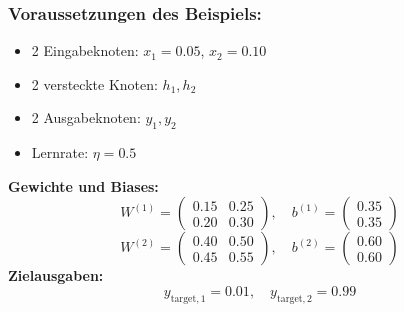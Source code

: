 \documentclass[12pt]{article}
\begin{document}
\subsubsection*{Voraussetzungen des Beispiels:}

\begin{itemize}
    \item 2 Eingabeknoten: \( x_1 = 0.05 \), \( x_2 = 0.10 \)
    \item 2 versteckte Knoten: \( h_1, h_2 \)
    \item 2 Ausgabeknoten: \( y_1, y_2 \)
    \item Lernrate: \( \eta = 0.5 \)
\end{itemize}
%
\textbf{Gewichte und Biases:}
\[
W^{(1)} = \begin{pmatrix} 0.15 & 0.25 \\ 0.20 & 0.30 \end{pmatrix}, \quad
b^{(1)} = \begin{pmatrix} 0.35 \\ 0.35 \end{pmatrix}
\]
\[
W^{(2)} = \begin{pmatrix} 0.40 & 0.50 \\ 0.45 & 0.55 \end{pmatrix}, \quad
b^{(2)} = \begin{pmatrix} 0.60 \\ 0.60 \end{pmatrix}
\]
%
\textbf{Zielausgaben:}
\[
y_{\text{target}, 1} = 0.01, \quad y_{\text{target}, 2} = 0.99
\]


%
\end{document}
